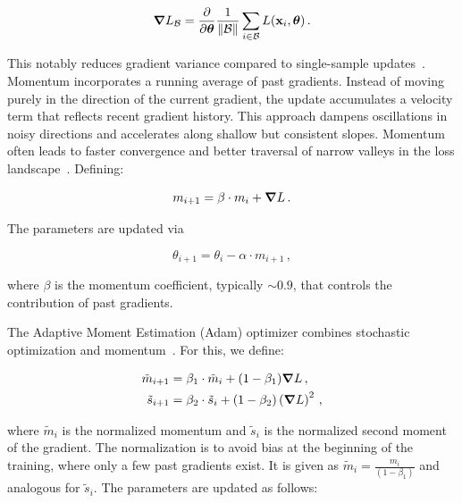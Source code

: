 \begin{equation}
\label{eq:batch_stochastic_gradient_descent}
	\grad L_{\mathcal{B}} = \frac{\partial}{\partial  \boldsymbol{\theta}} \frac{1}{\|\mathcal{B}\|} \sum_{i \in \mathcal{B}} L(\mathbf{x}_i, \boldsymbol{\theta}) \,.
\end{equation}

This notably reduces gradient variance compared to single-sample updates~\cite{zhang_dive_2023}.
Momentum incorporates a running average of past gradients. Instead of moving purely in the direction of the current gradient, the update accumulates a velocity term that reflects recent gradient history. 
This approach dampens oscillations in noisy directions and accelerates along shallow but consistent slopes. Momentum often leads to faster convergence and better traversal of narrow valleys in the loss landscape~\cite{zhang_dive_2023, murphy_probabilistic_2022}. 
Defining: 

\begin{equation}
\label{eq:momentum1}
	m_{i+1} = \beta \cdot m_i + \grad L \,.
\end{equation}

The parameters are updated via

\begin{equation}
\label{eq:momentum2}
	\theta_{i+1} = \theta_i - \alpha \cdot m_{i+1} \,,
\end{equation}

\noindent where $\beta$ is the momentum coefficient, typically $\sim 0.9$, that controls the contribution of past gradients. 

The Adaptive Moment Estimation (Adam) optimizer combines stochastic optimization and momentum~\cite{kingma_adam_2017}. For this, we define:

\begin{align}
\label{eq:ADAM1}
	\tilde m_{i+1} & = \beta_1 \cdot \tilde m_i + (1 - \beta_1) \grad L \,,\\
\label{eq:ADAM2}
	\tilde s_{i+1} & = \beta_2 \cdot \tilde s_i + (1 - \beta_2) \left(\grad L \right)^2 \,,
\end{align}

\noindent where $\tilde m_i$ is the normalized momentum and $\tilde s_i$ is the normalized second moment of the gradient. The normalization is to avoid bias at the beginning of the training, where only a few past gradients exist. It is given as $\tilde m_i = \frac{m_i}{(1 - \beta_1)}$ and analogous for $\tilde s_i$. 
The parameters are updated as follows: 

